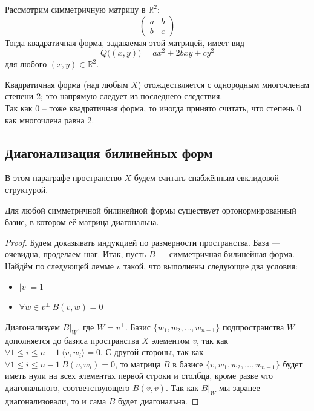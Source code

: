 \documentclass[11pt]{article}
\begin{document}
    \begin{example}
    Рассмотрим симметричную матрицу в $\mathbb{R}^2$:
    \begin{equation*}
        \begin{pmatrix}
        a & b\\
        b & c
        \end{pmatrix}
    \end{equation*}
    Тогда квадратичная форма, задаваемая этой матрицей, имеет вид
    \begin{equation*}
        Q\big((x, y)\big) = ax^2 + 2bxy + cy^2
    \end{equation*}
    для любого $(x, y) \in \mathbb{R}^2$.
    \end{example}

    \begin{remark}
    Квадратичная форма (над любым $X$) отождествляется с однородным многочленам степени $2$; это напрямую следует из последнего следствия. \\
    Так как $0$ -- тоже квадратичная форма, то иногда принято считать, что степень $0$ как многочлена равна $2$.
    \end{remark}

    \subsection{Диагонализация билинейных форм}

    В этом параграфе пространство $X$ будем считать снабжённым евклидовой структурой.

    \begin{theorem}
    Для любой симметричной билинейной формы существует ортонормированный базис, в котором её матрица диагональна.
    \end{theorem}

    \begin{proof}
    Будем доказывать индукцией по размерности пространства. База --- очевидна, проделаем шаг. Итак, пусть $B$ --- симметричная билинейная форма. Найдём по следующей лемме $v$ такой, что выполнены следующие два условия:
    \begin{itemize}
        \item $|v| = 1$
        \item $\forall w \in v^{\bot} \ B(v, w) = 0$
    \end{itemize}
    Диагонализуем $B|_{W}$, где $W = v^{\bot}$. Базис $\{w_1, w_2, \hdots, w_{n-1}\}$ подпространства $W$ дополняется до базиса пространства $X$ элементом $v$, так как $\forall 1 \leq i \leq n - 1 \ \langle v, w_{i} \rangle = 0$. С другой стороны, так как $\forall 1 \leq i \leq n - 1 \ B(v, w_{i}) = 0$, то матрица $B$ в базисе $\{v, w_1, w_2, \hdots, w_{n-1}\}$ будет иметь нули на всех элементах первой строки и столбца, кроме разве что диагонального, соответствующего $B(v, v)$. Так как $B|_{W}$ мы заранее диагонализовали, то и сама $B$ будет диагональна.
    \end{proof}
\end{document}
